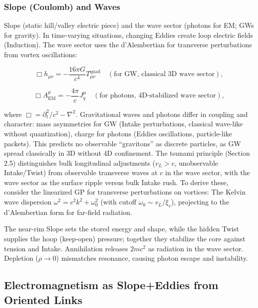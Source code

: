 \subsubsection{Slope (Coulomb) and Waves}

Slope (static hill/valley electric piece) and the wave sector (photons for EM; GWs for gravity). In time-varying situations, changing Eddies create loop electric fields (Induction). The wave sector uses the d'Alembertian for transverse perturbations from vortex oscillations:

\begin{equation}
\Box h_{\mu\nu} = -\frac{16\pi G}{c^4} T_{\mu\nu}^{\text{quad}} \quad (\text{for GW, classical 3D wave sector}),
\end{equation}

\begin{equation}
\Box A^\mu_{\text{EM}} = -\frac{4\pi}{c} J_q^\mu \quad (\text{for photons, 4D-stabilized wave sector}),
\end{equation}

where $\Box = \partial_t^2 / c^2 - \nabla^2$. Gravitational waves and photons differ in coupling and character: mass asymmetries for GW (Intake perturbations, classical wave-like without quantization), charge for photons (Eddies oscillations, particle-like packets). This predicts no observable ``gravitons'' as discrete particles, as GW spread classically in 3D without 4D confinement. The tsunami principle (Section 2.5) distinguishes bulk longitudinal adjustments ($v_L > c$, unobservable Intake/Twist) from observable transverse waves at $c$ in the wave sector, with the wave sector as the surface ripple versus bulk Intake rush. To derive these, consider the linearized GP for transverse perturbations on vortices: The Kelvin wave dispersion $\omega^2 = c^2 k^2 + \omega_0^2$ (with cutoff $\omega_0 \sim v_L / \xi_c$), projecting to the d'Alembertian form for far-field radiation.

The near-rim Slope sets the stored energy and shape, while the hidden Twist supplies the hoop (keep-open) pressure; together they stabilize the core against tension and Intake. Annihilation releases $2mc^2$ as radiation in the wave sector. Depletion ($\rho \to 0$) mismatches resonance, causing photon escape and instability.


\subsection{Electromagnetism as Slope+Eddies from Oriented Links}
\label{sec:EM-from-helical-vortices}

